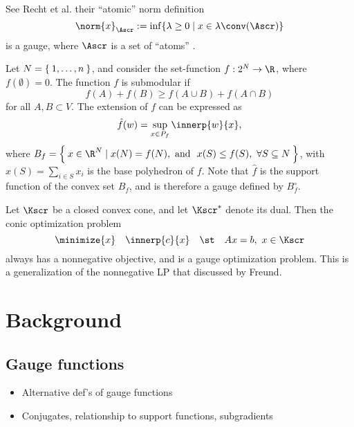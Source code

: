 \documentclass{siamltex}   %
\begin{document}
  \begin{example}
    See Recht et al.  their ``atomic'' norm definition
    \[
    \norm{x}_{\Ascr} := \inf\{ \lambda\ge0 \mid x\in\lambda\conv(\Ascr)\}
    \]
    is a gauge, where $\Ascr$ is a set of ``atoms'' \cite{Chan:2012}.
  \end{example}

  \begin{example}
    Let $N=\Set{1,\ldots,n}$, and consider the set-function
    $f:2^{N}\to\R$, where $f(\emptyset)=0$. The function $f$ is
    submodular if
    \[
    f(A) + f(B) \ge f(A\cup B) + f(A\cap B)
    \]
    for all $A,B\subset V$. The \cite{Lovasz:1983}
    extension of $f$ can be expressed as
    \[
    \hat f(w) = \sup_{x\in P_{f}}\innerp{w}{x},
    \]
    where $B_{f}=\Set{x\in\R^{N}\mid x(N) = f(N), \text{\ and \
      }x(S)\le f(S),\ \forall S\subseteq N}$, with $x(S)=\sum_{i\in
      S}x_{i}$ is the base polyhedron of $f$. Note that $\hat f$ is
    the support function of the convex set $B_{f}$, and is therefore a
    gauge defined by $B^{\circ}_{f}$.
  \end{example}

  \begin{example}
    Let $\Kscr$ be a closed convex cone, and let $\Kscr^{*}$ denote
    its dual. Then the conic optimization problem
    \begin{equation}
      \label{eq:2}
      \minimize{x} \quad \innerp{c}{x} \quad\st\quad Ax = b,\ x\in\Kscr
    \end{equation}
    always has a nonnegative objective, and is a gauge optimization
    problem. This is a generalization of the nonnegative LP that
    discussed by Freund.
  \end{example}

  \section{Background}

  \subsection{Gauge functions}
  \label{sec:gauges}

  \begin{itemize}
  \item Alternative def's of gauge functions
  \item Conjugates, relationship to support functions,  subgradients
  \end{itemize}
\end{document}
